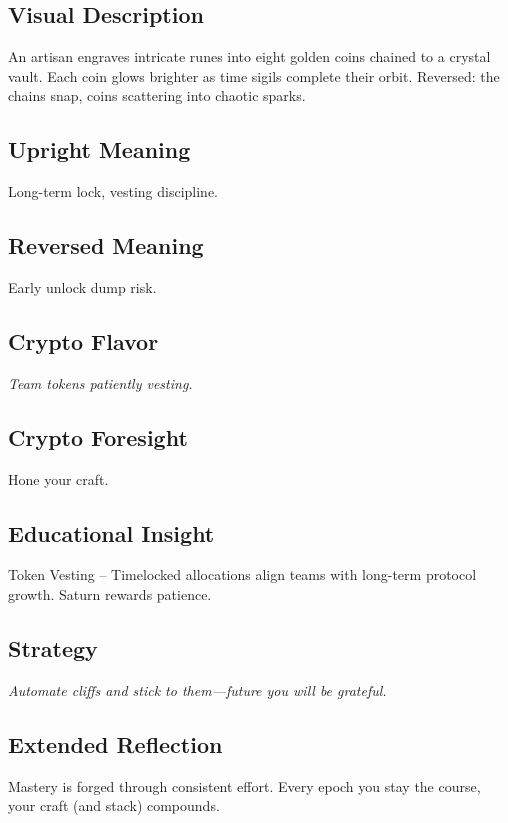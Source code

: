 \documentclass[11pt,oneside]{book}
\begin{document}
\begin{minipage}[t]{0.55\textwidth}
  \vspace{0pt}

  \subsection*{Visual Description}
  An artisan engraves intricate runes into eight golden coins chained to a crystal vault. Each coin glows brighter as time sigils complete their orbit. Reversed: the chains snap, coins scattering into chaotic sparks.

  \subsection*{Upright Meaning}
  Long-term lock, vesting discipline.

  \subsection*{Reversed Meaning}
  Early unlock dump risk.

  \subsection*{Crypto Flavor}
  \textit{Team tokens patiently vesting.}

  \subsection*{Crypto Foresight}
  Hone your craft.

  \subsection*{Educational Insight}
  Token Vesting – Timelocked allocations align teams with long-term protocol growth. Saturn rewards patience.

  \subsection*{Strategy}
  \textit{Automate cliffs and stick to them—future you will be grateful.}

  \subsection*{Extended Reflection}
  Mastery is forged through consistent effort. Every epoch you stay the course, your craft (and stack) compounds.


\end{minipage}
\end{document}
